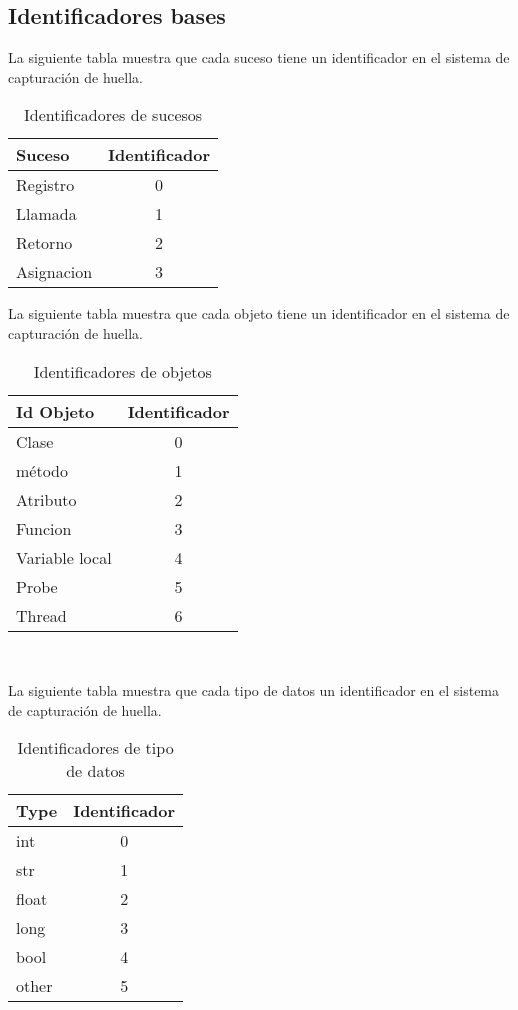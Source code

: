 \documentclass[10pt,a4paper]{article}
\begin{document}
\subsection{Identificadores bases}

La siguiente tabla muestra que cada suceso tiene un identificador en el sistema de capturación de huella.
\begin{table}[!h]
\begin{center}
\begin{tabular}{|l | c |}
\hline
Suceso & Identificador\\
\hline
Registro & 0\\
\hline
Llamada & 1\\
\hline
Retorno & 2\\
\hline
Asignacion & 3\\
\hline
\end{tabular}
\caption{Identificadores de sucesos} 
\end{center}
\end{table}

La siguiente tabla muestra que cada objeto tiene un identificador en el sistema de capturación de huella.
\begin{table}[!h]
\begin{center}
\begin{tabular}{|l | c |}
\hline
Id Objeto & Identificador\\
\hline
Clase & 0\\
\hline
método & 1\\
\hline
Atributo & 2\\
\hline
Funcion & 3\\
\hline
Variable local & 4\\
\hline
Probe & 5\\
\hline
Thread & 6\\
\hline
\end{tabular}
\caption{Identificadores de objetos} 
\end{center}
\end{table}
\\
\pagebreak

La siguiente tabla muestra que cada tipo de datos un identificador en el sistema de capturación de huella.
\begin{table}[!h]
\begin{center}
\begin{tabular}{|l | c |}
\hline
Type & Identificador\\
\hline
int & 0\\
\hline
str & 1\\
\hline
float & 2\\
\hline
long & 3\\
\hline
bool & 4\\
\hline
other & 5\\
\hline
\end{tabular}
\caption{Identificadores de tipo de datos} 
\end{center}
\end{table}
\end{document}
